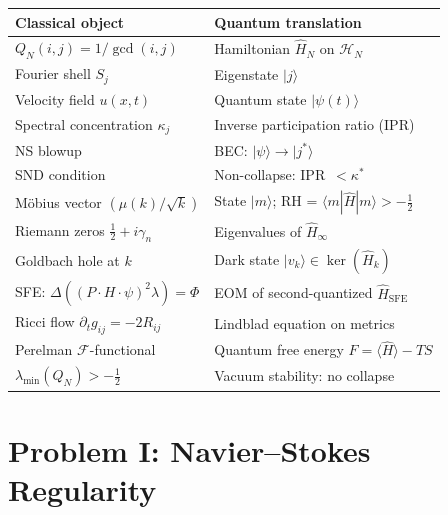 \documentclass[12pt]{article}
\newcommand{\ket}[1]{|{#1}\rangle}
\newcommand{\bra}[1]{\langle{#1}|}
\newcommand{\Hil}{\mathcal{H}}
\newcommand{\half}{\tfrac{1}{2}}
\begin{document}
\begin{center}
\renewcommand{\arraystretch}{1.5}
\small
\begin{tabular}{@{}p{5.0cm}p{7.8cm}@{}}
\toprule
\textbf{Classical object} & \textbf{Quantum translation} \\
\midrule
$Q_N(i,j) = 1/\gcd(i,j)$ &
  Hamiltonian $\hat{H}_N$ on $\Hil_N$ \\
Fourier shell $S_j$ & Eigenstate $\ket{j}$ \\
Velocity field $u(x,t)$ & Quantum state $\ket{\psi(t)}$ \\
Spectral concentration $\kappa_j$ & Inverse participation ratio (IPR) \\
NS blowup & BEC: $\ket{\psi}\to\ket{j^*}$ \\
SND condition & Non-collapse: IPR~$<\kappa^*$ \\
M\"{o}bius vector $(\mu(k)/\sqrt{k})$ & State $\ket{m}$; RH = $\bra{m}\hat{H}\ket{m}>-\half$ \\
Riemann zeros $\half+i\gamma_n$ & Eigenvalues of $\hat{H}_\infty$ \\
Goldbach hole at $k$ & Dark state $\ket{v_k}\in\ker(\hat{H}_k)$ \\
SFE: $\Delta((P\cdot H\cdot\psi)^2\lambda)=\Phi$ &
  EOM of second-quantized $\hat{H}_{\mathrm{SFE}}$ \\
Ricci flow $\partial_t g_{ij}=-2R_{ij}$ & Lindblad equation on metrics \\
Perelman $\mathcal{F}$-functional & Quantum free energy $F=\langle\hat{H}\rangle-TS$ \\
$\lambda_{\min}(Q_N)>-\half$ & Vacuum stability: no collapse \\
\bottomrule
\end{tabular}
\end{center}

\newpage
\section{Problem I: Navier--Stokes Regularity}
\end{document}
